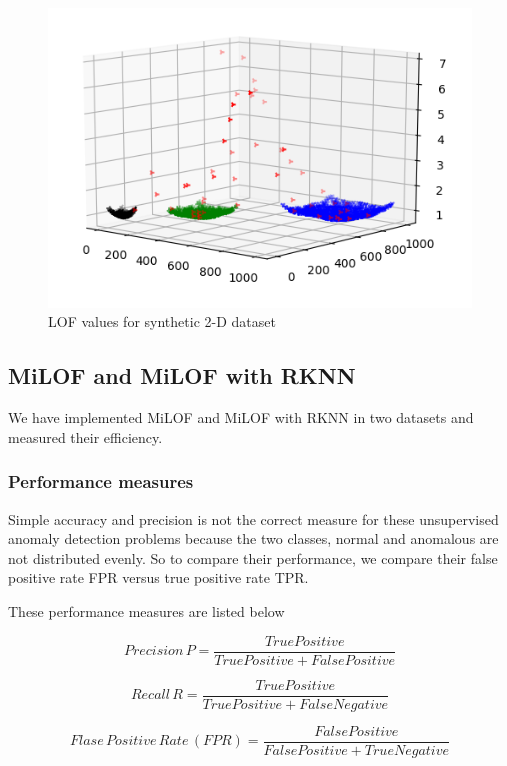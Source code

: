 \begin{figure}[H]
	\centering
	\includegraphics{chap04/LOF_result.png}
	\caption{LOF values for synthetic 2-D dataset}
\end{figure}


\subsection{MiLOF and MiLOF with RKNN}

We have implemented MiLOF and MiLOF with RKNN in two datasets and measured their efficiency.

\subsubsection{Performance measures}
Simple accuracy and precision is not the correct measure for these unsupervised anomaly detection problems because the two classes, normal and anomalous are not distributed evenly. So to compare their performance, we compare their false positive rate FPR versus true positive rate TPR.

These performance measures are listed below


\[  Precision \, P = \frac{True Positive }{True Positive + False Positive} \]

\[  Recall \,  R = \frac{True Positive }{True Positive + False Negative} \]

\[  Flase \, Positive \, Rate \,  (FPR) = \frac{False Positive }{False Positive + True Negative} \]
\\
\\


